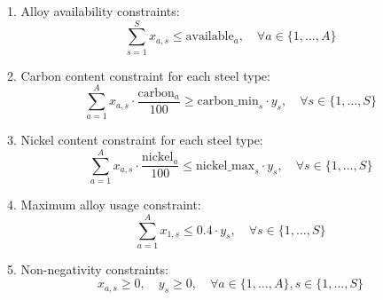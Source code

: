 \documentclass{article}
\begin{document}
1. Alloy availability constraints:
\[
\sum_{s=1}^{S} x_{a,s} \leq \text{available}_{a}, \quad \forall a \in \{1, \ldots, A\}
\]

2. Carbon content constraint for each steel type:
\[
\sum_{a=1}^{A} x_{a,s} \cdot \frac{\text{carbon}_{a}}{100} \geq \text{carbon\_min}_{s} \cdot y_s, \quad \forall s \in \{1, \ldots, S\}
\]

3. Nickel content constraint for each steel type:
\[
\sum_{a=1}^{A} x_{a,s} \cdot \frac{\text{nickel}_{a}}{100} \leq \text{nickel\_max}_{s} \cdot y_s, \quad \forall s \in \{1, \ldots, S\}
\]

4. Maximum alloy usage constraint:
\[
\sum_{a=1}^{A} x_{1,s} \leq 0.4 \cdot y_s, \quad \forall s \in \{1, \ldots, S\}
\]

5. Non-negativity constraints:
\[
x_{a,s} \geq 0, \quad y_s \geq 0, \quad \forall a \in \{1, \ldots, A\}, s \in \{1, \ldots, S\}
\]
\end{document}
